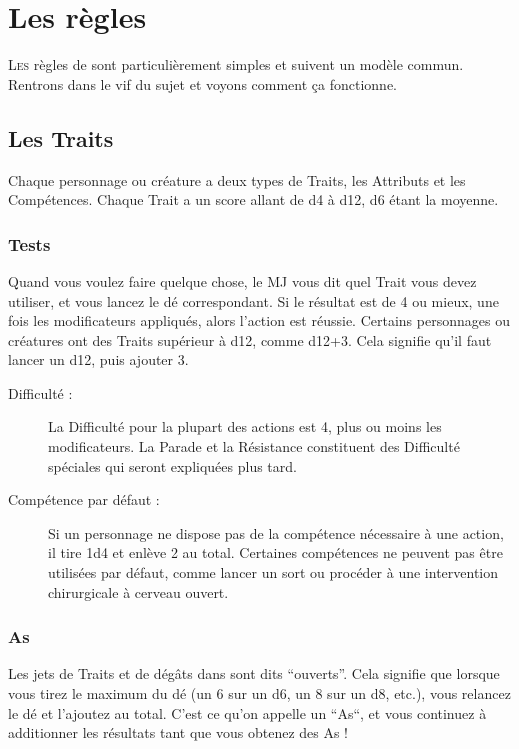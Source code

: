 
\section{Les règles}
\lettrine{L}{es} règles de \swfe sont particulièrement simples et suivent un modèle commun. Rentrons dans le vif du sujet et voyons comment ça fonctionne.

\subsection{Les Traits}
Chaque personnage ou créature a deux types de Traits, les Attributs et les Compétences. Chaque Trait a un score allant de d4 à d12, d6 étant la moyenne.

\subsubsection{Tests}
Quand vous voulez faire quelque chose, le MJ vous dit quel Trait vous devez utiliser, et vous lancez le dé correspondant. Si le résultat est de 4 ou mieux, une fois les modificateurs appliqués, alors l’action est réussie. Certains personnages ou créatures ont des Traits supérieur à d12, comme d12+3. Cela signifie qu’il faut lancer un d12, puis ajouter 3.

\begin{description}
\item[Difficulté :] La Difficulté pour la plupart des actions est 4, plus ou moins les modificateurs. La Parade et la Résistance constituent des Difficulté spéciales qui seront expliquées plus tard.

\item[Compétence par défaut :] Si un personnage ne dispose pas de la compétence nécessaire à une action, il tire 1d4 et enlève 2 au total. Certaines compétences ne peuvent pas être utilisées par défaut, comme lancer un sort ou procéder à une intervention chirurgicale à cerveau ouvert.
\end{description}

\subsubsection{As}
Les jets de Traits et de dégâts dans \swfe sont dits “ouverts”. Cela signifie que lorsque vous tirez le maximum du dé (un 6 sur un d6, un 8 sur un d8, etc.), vous relancez le dé et l’ajoutez au total. C’est ce qu’on appelle un “As“, et vous continuez à additionner les résultats tant que vous obtenez des As !


